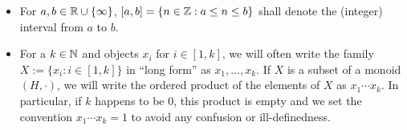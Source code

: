 \begin{itemize}
	\item For $a, b\in \mathbb{R}\cup\{\infty\}$, $[ a,b ] = \{ n\in \mathbb{Z} : a \le n \le b \}$ shall denote the (integer) interval from $a$ to $b$.
	
	\item For a $k\in \mathbb{N}$ and objects $x_i$ for $i\in [1,k]$, we will often write the family $X:=\{x_i: i\in [1,k]\}$ in ``long form'' as $x_1,\dots,x_k$.
	If $X$ is a subset of a monoid $(H,\cdot)$, we will write the ordered product of the elements of $X$ as $x_1\cdots x_k$.
	In particular, if $k$ happens to be $0$, this product is empty and we set the convention $x_1\cdots x_k = 1$ to avoid any confusion or ill-definedness.
\end{itemize}




